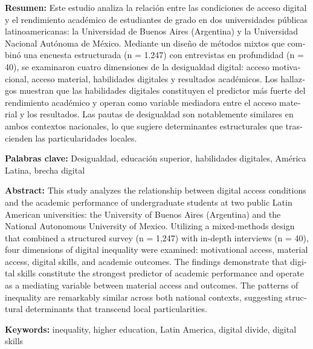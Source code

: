 \documentclass{article}
\begin{document}
\begin{tcolorbox}[colback=brown!8!white,colframe=brown!8!white,boxrule=0pt,arc=2pt,left=4pt,right=4pt,top=3pt,bottom=3pt,before skip=4pt,after skip=4pt]
\begin{otherlanguage}{spanish}
\sffamily\small \textbf{Resumen:} Este estudio analiza la relación entre las condiciones de acceso digital y el rendimiento académico de estudiantes de grado en dos universidades públicas latinoamericanas: la Universidad de Buenos Aires (Argentina) y la Universidad Nacional Autónoma de México. Mediante un diseño de métodos mixtos que combinó una encuesta estructurada (n = 1.247) con entrevistas en profundidad (n = 40), se examinaron cuatro dimensiones de la desigualdad digital: acceso motivacional, acceso material, habilidades digitales y resultados académicos. Los hallazgos muestran que las habilidades digitales constituyen el predictor más fuerte del rendimiento académico y operan como variable mediadora entre el acceso material y los resultados. Las pautas de desigualdad son notablemente similares en ambos contextos nacionales, lo que sugiere determinantes estructurales que trascienden las particularidades locales.

\par\smallskip\noindent\textbf{Palabras clave:} Desigualdad, educación superior, habilidades digitales, América Latina, brecha digital
\end{otherlanguage}
\end{tcolorbox}

\begin{tcolorbox}[colback=brown!8!white,colframe=brown!8!white,boxrule=0pt,arc=2pt,left=4pt,right=4pt,top=3pt,bottom=3pt,before skip=4pt,after skip=4pt]
\begin{otherlanguage}{english}
\sffamily\small \textbf{Abstract:} This study analyzes the relationship between digital access conditions and the academic performance of undergraduate students at two public Latin American universities: the University of Buenos Aires (Argentina) and the National Autonomous University of Mexico. Utilizing a mixed-methods design that combined a structured survey (n = 1,247) with in-depth interviews (n = 40), four dimensions of digital inequality were examined: motivational access, material access, digital skills, and academic outcomes. The findings demonstrate that digital skills constitute the strongest predictor of academic performance and operate as a mediating variable between material access and outcomes. The patterns of inequality are remarkably similar across both national contexts, suggesting structural determinants that transcend local particularities.
\par\smallskip\noindent\textbf{Keywords:} inequality, higher education, Latin America, digital divide, digital skills
\end{otherlanguage}
\end{tcolorbox}
\end{document}
